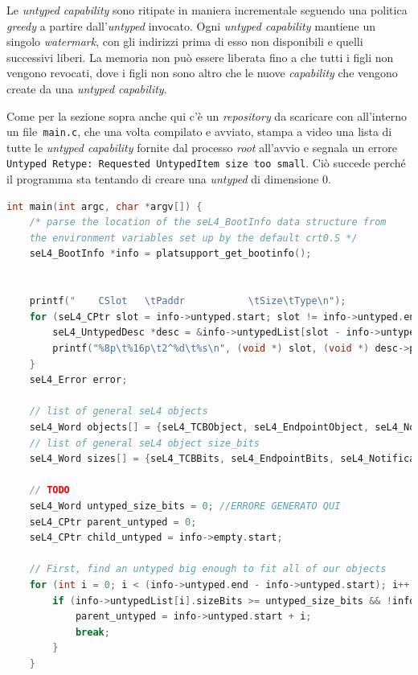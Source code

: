Le \textit{untyped capability} sono ritipate in maniera incrementale seguendo una politica \textit{greedy} a partire dall'\textit{untyped} invocato. Ogni \textit{untyped capability} mantiene un singolo \textit{watermark}, con gli indirizzi prima di esso non disponibili e quelli successivi liberi. La memoria non può essere liberata fino a che tutti i figli non vengono revocati, dove i figli non sono altro che le nuove \textit{capability} che vengono create da una \textit{untyped capability}.

Come per la sezione sopra anche qui c'è un \textit{repository} da scaricare con all'interno un file\texttt{ main.c}, che una volta compilato e avviato, stampa a video una lista di tutte le \textit{untyped capability} fornite dal processo \textit{root} all'avvio e segnala un errore \texttt{Untyped Retype: Requested UntypedItem size too small}. Ciò succede perché il programma sta tentando di creare una \textit{untyped} di dimensione 0.
\begin{lstlisting}[language=C++]
int main(int argc, char *argv[]) {
    /* parse the location of the seL4_BootInfo data structure from
    the environment variables set up by the default crt0.S */
    seL4_BootInfo *info = platsupport_get_bootinfo();


    printf("    CSlot   \tPaddr           \tSize\tType\n");
    for (seL4_CPtr slot = info->untyped.start; slot != info->untyped.end; slot++) {
        seL4_UntypedDesc *desc = &info->untypedList[slot - info->untyped.start];
        printf("%8p\t%16p\t2^%d\t%s\n", (void *) slot, (void *) desc->paddr, desc->sizeBits, desc->isDevice ? "device untyped" : "untyped");
    }
    seL4_Error error;

    // list of general seL4 objects
    seL4_Word objects[] = {seL4_TCBObject, seL4_EndpointObject, seL4_NotificationObject};
    // list of general seL4 object size_bits
    seL4_Word sizes[] = {seL4_TCBBits, seL4_EndpointBits, seL4_NotificationBits};
    
    // TODO
    seL4_Word untyped_size_bits = 0; //ERRORE GENERATO QUI
    seL4_CPtr parent_untyped = 0;
    seL4_CPtr child_untyped = info->empty.start;

    // First, find an untyped big enough to fit all of our objects
    for (int i = 0; i < (info->untyped.end - info->untyped.start); i++) {
        if (info->untypedList[i].sizeBits >= untyped_size_bits && !info->untypedList[i].isDevice) {
            parent_untyped = info->untyped.start + i;
            break;
        }
    }
\end{lstlisting}

